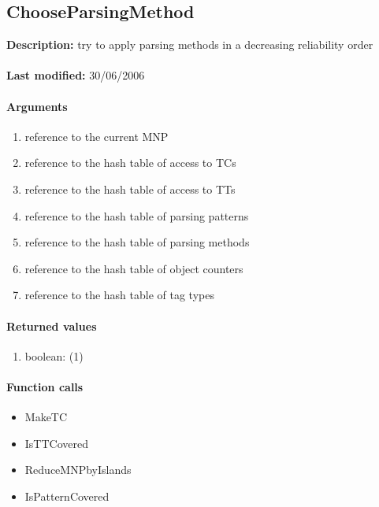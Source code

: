 \subsection{ChooseParsingMethod}
\textbf{Description:} try to apply parsing methods in a decreasing reliability order\\
\\\textbf{Last modified:} 30/06/2006

\paragraph{Arguments}
\begin{enumerate}
\item reference to the current MNP
\item reference to the hash table of access to TCs
\item reference to the hash table of access to TTs
\item reference to the hash table of parsing patterns
\item reference to the hash table of parsing methods
\item reference to the hash table of object counters
\item reference to the hash table of tag types
\end{enumerate}

\paragraph{Returned values}
\begin{enumerate}
\item boolean: (1)
\end{enumerate}

\paragraph{Function calls}
\begin{itemize}
\item MakeTC
\item IsTTCovered
\item ReduceMNPbyIslands
\item IsPatternCovered
\end{itemize}

